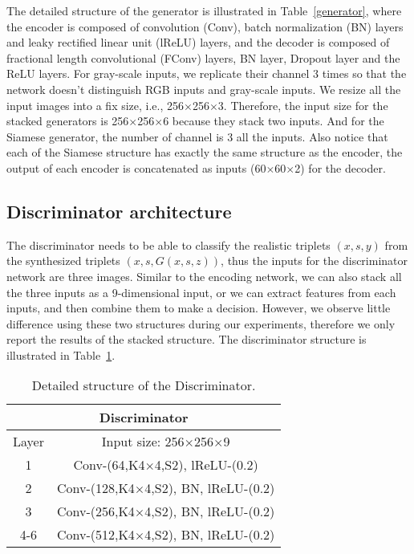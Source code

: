 \documentclass[journal]{IEEEtran}
\begin{document}
The detailed structure of the generator is illustrated in Table~\ref{generator}, where the encoder is composed of convolution (Conv), batch normalization (BN) layers and leaky rectified linear unit (lReLU) layers, and the decoder is composed of fractional length convolutional (FConv) layers, BN layer, Dropout layer and the ReLU layers.
For gray-scale inputs, we replicate their channel 3 times so that the network doesn't distinguish RGB inputs and gray-scale inputs.
We resize all the input images into a fix size, i.e., 256$\times$256$\times$3. Therefore, the input size for the stacked generators is 256$\times$256$\times$6 because they stack two inputs. And for the Siamese generator, the number of channel is 3 all the inputs.  Also notice that each of the Siamese structure has exactly the same structure as the encoder, the output of each encoder is concatenated as inputs (60$\times$60$\times$2) for the decoder.

\subsection{Discriminator architecture}
The discriminator needs to be able to classify the realistic triplets $(x,s,y)$ from the synthesized triplets $(x,s,G(x,s,z))$, thus the inputs for the discriminator network are three images. Similar to the encoding network, we can also stack all the three inputs as a 9-dimensional input, or we can extract features from each inputs, and then combine them to make a decision. However, we observe little difference using these two structures during our experiments, therefore we only report the results of the stacked structure.
The discriminator structure is illustrated in Table~\ref{discriminator}.

\begin{table}[]
\centering
\caption{Detailed structure of the Discriminator.}
\label{discriminator}
\begin{tabular}{|c|c|}
\hline
\multicolumn{2}{|c|}{\textbf{Discriminator}}                \\ \hline
Layer & Input size: 256$\times$256$\times$9                       \\ \hline
1     & Conv-(64,K4$\times$4,S2), lReLU-(0.2)                   \\
2     & Conv-(128,K4$\times$4,S2), BN, lReLU-(0.2)                  \\
3     & Conv-(256,K4$\times$4,S2), BN, lReLU-(0.2)                  \\
4-6   & Conv-(512,K4$\times$4,S2), BN, lReLU-(0.2)                  \\      \hline
\end{tabular}
\end{table}
\end{document}
